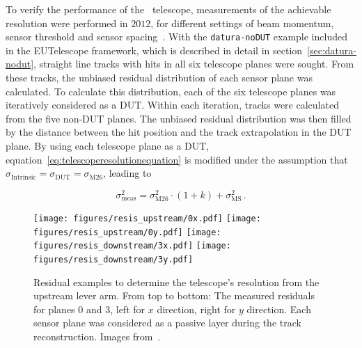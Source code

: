 To verify the performance of the \Datura~telescope, measurements of the achievable resolution were performed in $2012$, for different settings of beam momentum,
 sensor threshold and sensor spacing~\cite{ref:thomas}.
With the \texttt{datura-noDUT} example included in the {EUTelescope} framework, which is described in detail in section~\ref{sec:datura-nodut},
 straight line tracks with hits in all six telescope planes were sought. 
From these tracks, the unbiased residual distribution of each sensor plane was calculated.
To calculate this distribution, each of the six telescope planes was iteratively considered as a DUT.
Within each iteration, tracks were calculated from the five non-DUT planes.
The unbiased residual distribution was then filled by the distance between the hit position and the track extrapolation in the DUT plane.
By using each telescope plane as a DUT, equation~\ref{eq:telescoperesolutionequation} is modified under the assumption that $\sigma_{\textrm{Intrinsic}} = \sigma_{\textrm{DUT}} = \sigma_{\textrm{M26}}$,
 leading to

\begin{equation}
\label{eq:telescoperesolutionequation_2}
\sigma_{\textrm{meas}}^2 = \sigma_{\textrm{M26}}^2 \cdot \left( 1 + k \right) +
\sigma_{\textrm{MS}}^2\,.
\end{equation}

\begin{figure}[tb]
  \centering
  \texttt{[image: figures/resis\_upstream/0x.pdf]}
  \texttt{[image: figures/resis\_upstream/0y.pdf]}
  \texttt{[image: figures/resis\_downstream/3x.pdf]}
  \texttt{[image: figures/resis\_downstream/3y.pdf]}
  \caption[Residual examples to determine the \Datura telescope's resolution~\cite{ref:thomas}]{Residual examples to determine the \Datura telescope's resolution from the upstream lever arm.
From top to bottom: The measured residuals for planes $0$ and $3$, left for $x$ direction, right for $y$ direction.
Each sensor plane was considered as a passive layer during the track reconstruction. Images from~\cite{ref:thomas}.}
  \label{fig:residualexample1}
\end{figure}

